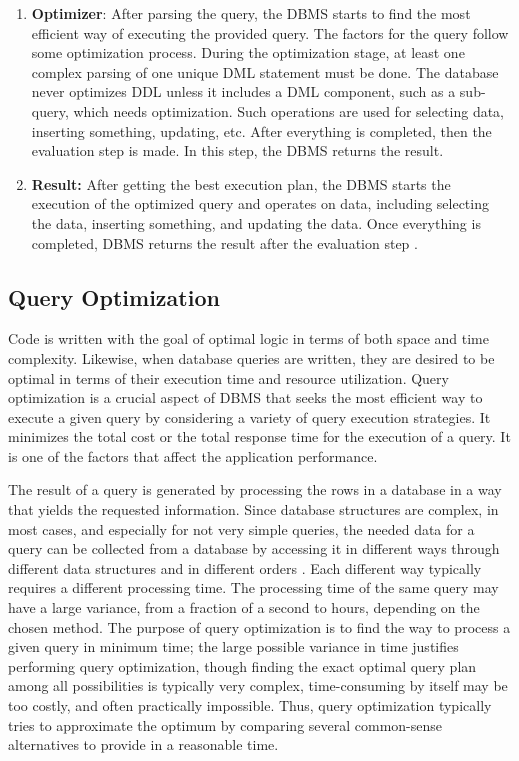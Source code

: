 \begin{enumerate}
    \item \textbf{Optimizer}: After parsing the query, the DBMS starts to find the most efficient way of executing the provided query. The factors for the query follow some optimization process. During the optimization stage, at least one complex parsing of one unique DML statement must be done. The database never optimizes DDL unless it includes a DML component, such as a sub-query, which needs optimization. Such operations are used for selecting data, inserting something, updating, etc. After everything is completed, then the evaluation step is made. In this step, the DBMS returns the result.
    
    \item \textbf{Result:} After getting the best execution plan, the DBMS starts the execution of the optimized query and operates on data, including selecting the data, inserting something, and updating the data. Once everything is completed, DBMS returns the result after the evaluation step \cite{Query,QueryProcessing,Oracle}.
    
\end{enumerate}

\subsection{Query Optimization } Code is written with the goal of optimal logic in terms of both space and time complexity. Likewise, when database queries are written, they are desired to be optimal in terms of their execution time and resource utilization. Query optimization is a crucial aspect of DBMS that seeks the most efficient way to execute a given query by considering a variety of query execution strategies. It minimizes the total cost or the total response time for the execution of a query. It is one of the factors that affect the application performance.\vspace{.4cm}

The result of a query is generated by processing the rows in a database in a way that yields the requested information. Since database structures are complex, in most cases, and especially for not very simple queries, the needed data for a query can be collected from a database by accessing it in different ways through different data structures and in different orders \cite{selinger-1979}. Each different way typically requires a different processing time. The processing time of the same query may have a large variance, from a fraction of a second to hours, depending on the chosen method. The purpose of query optimization is to find the way to process a given query in minimum time; the large possible variance in time justifies performing query optimization, though finding the exact optimal query plan among all possibilities is typically very complex, time-consuming by itself may be too costly, and often practically impossible. Thus, query optimization typically tries to approximate the optimum by comparing several common-sense alternatives to provide in a reasonable time.\vspace{.4cm}


